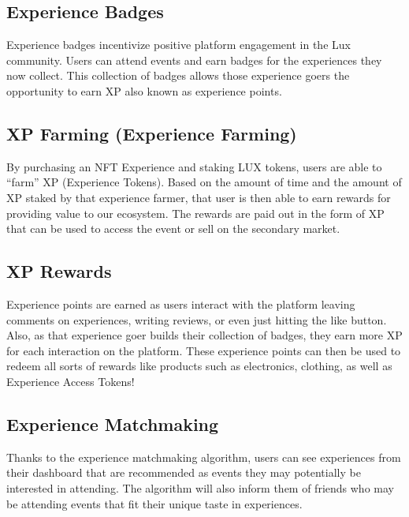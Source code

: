 \documentclass[11pt]{article}
\begin{document}
\subsection{Experience Badges}

Experience badges incentivize positive platform engagement in the Lux community. Users can attend events and earn badges for the experiences they now collect. This collection of badges allows those experience goers the opportunity to earn XP also known as experience points.


\subsection{XP Farming (Experience Farming)}

By purchasing an NFT Experience and staking LUX tokens, users are able to ``farm'' XP (Experience Tokens). Based on the amount of time and the amount of XP staked by that experience farmer, that user is then able to earn rewards for providing value to our ecosystem. The rewards are paid out in the form of XP that can be used to access the event or sell on the secondary market.


\subsection{XP Rewards}

Experience points are earned as users interact with the platform leaving comments on experiences, writing reviews, or even just hitting the like button. Also, as that experience goer builds their collection of badges, they earn more XP for each interaction on the platform. These experience points can then be used to redeem all sorts of rewards like products such as electronics, clothing, as well as Experience Access Tokens!


\subsection{Experience Matchmaking}

Thanks to the experience matchmaking algorithm, users can see experiences from their dashboard that are recommended as events they may potentially be interested in attending.  The algorithm will also inform them of friends who may be attending events that fit their unique taste in experiences.
\end{document}
